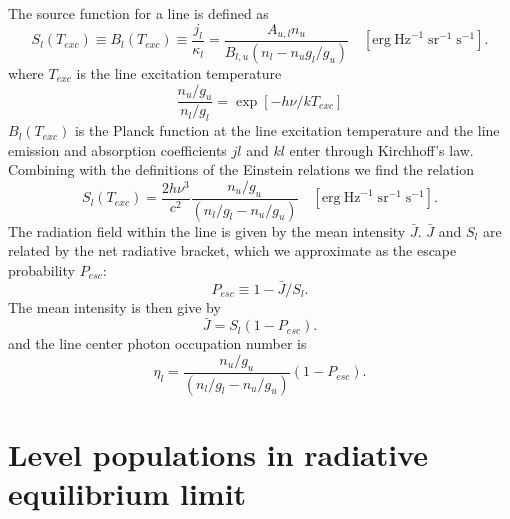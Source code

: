 The source function for a line is defined as
\begin{equation}
{S_l}\left( {{T_{exc}}} \right) \equiv {B_l}\left( {{T_{exc}}} \right)
\equiv \frac{{{j_l}}}{{{\kappa _l}}} =
\frac{{{A_{u,l}}{n_u}}}{{{B_{l,u}}\left( {{n_l} - {n_u}{g_l}/{g_u}}
\right)}}
\quad
  [\mathrm{erg~Hz}^{-1}\; \mathrm{sr}^{-1}\; \mathrm{s}^{-1}].
\end{equation}
where $T_{exc}$ is the line excitation temperature
\begin{equation}
\frac{{{n_u}/{g_u}}}{{{n_l}/{g_l}}} = \exp \left[ { - h\nu /k{T_{exc}}}
\right]
\end{equation}
$B_l(T_{exc})$ is the Planck function at the line excitation
temperature and the
line emission and absorption coefficients $jl$ and $kl$
enter through Kirchhoff's law.
Combining with the definitions of the Einstein relations we find the
relation
\begin{equation}
{S_l}\left( {{T_{exc}}} \right) = \frac{{2h{\nu
^3}}}{{{c^2}}}\frac{{{n_u}/{g_u}}}{{\left( {{n_l}/{g_l} - {n_u}/{g_u}}
\right)}}
\quad  [\mathrm{erg~Hz}^{-1}\; \mathrm{sr}^{-1}\; \mathrm{s}^{-1}].
\end{equation}
The radiation field within the line is given by the mean intensity
$\bar J$.
$\bar J$  and $S_l$ are related by the net radiative bracket,
which we approximate as
the escape probability $P_{esc}$:
\begin{equation}
{P_{esc}} \equiv 1 - \bar J/{S_l}. %
\end{equation}
The mean intensity is then give by
\begin{equation}
\bar J = {S_l}\left( {1 - {P_{esc}}} \right) .%
\end{equation}
and the line center photon occupation number is
\begin{equation}
{\eta _l} = \frac{{{n_u}/{g_u}}}{{\left( {{n_l}/{g_l} - {n_u}/{g_u}}
\right)}}\left( {1 - {P_{esc}}} \right).
\end{equation}

\section{Level populations in radiative equilibrium limit}

